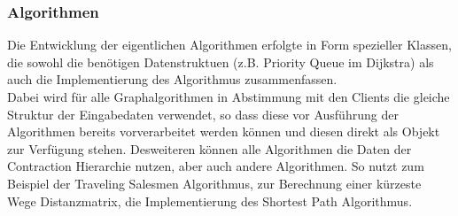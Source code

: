 \subsubsection*{Algorithmen}
Die Entwicklung der eigentlichen Algorithmen erfolgte in Form spezieller Klassen, die sowohl die benötigen Datenstruktuen (z.B. Priority Queue im Dijkstra) als auch die Implementierung des Algorithmus zusammenfassen.\\
Dabei wird für alle Graphalgorithmen in Abstimmung mit den Clients die gleiche Struktur der Eingabedaten verwendet, so dass diese vor Ausführung der Algorithmen bereits vorverarbeitet werden können und diesen direkt als Objekt zur Verfügung stehen. Desweiteren können alle Algorithmen die Daten der Contraction Hierarchie nutzen, aber auch andere Algorithmen. So nutzt zum Beispiel der Traveling Salesmen Algorithmus, zur Berechnung einer kürzeste Wege Distanzmatrix, die Implementierung des Shortest Path Algorithmus.\\
